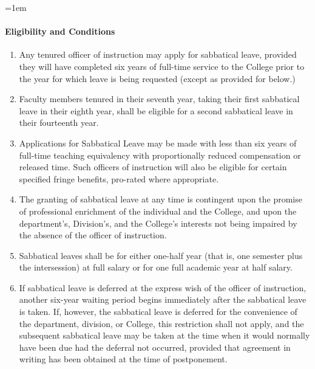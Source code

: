 \documentclass{manual}
\let\oldparagraph\paragraph
\renewcommand\paragraph{\leftskip=1em\oldparagraph}
\newcommand{\itemLevelA}{\alph*.}
\newcommand{\itemRefA}{\alph*}
\begin{document}
\paragraph{Eligibility and Conditions}
\begin{enumerate}[label=\itemLevelA,ref=\itemRefA]

\item Any tenured officer of instruction may apply for sabbatical leave, provided they will have completed six years of full-time service to the College prior to the year for which leave is being requested (except as provided for below.)

\item Faculty members tenured in their seventh year, taking their first sabbatical leave in their eighth year, shall be eligible for a second sabbatical leave in their fourteenth year.

\item Applications for Sabbatical Leave may be made with less than six years of full-time teaching equivalency with proportionally reduced compensation or released time. Such officers of instruction will also be eligible for certain specified fringe benefits, pro-rated where appropriate.

\item The granting of sabbatical leave at any time is contingent upon the promise of professional enrichment of the individual and the College, and upon the department's, Division's, and the College's interests not being impaired by the absence of the officer of instruction.

\item Sabbatical leaves shall be for either one-half year (that is, one semester plus the intersession) at full salary or for one full academic year at half salary.

\item If sabbatical leave is deferred at the express wish of the officer of instruction, another six-year waiting period begins immediately after the sabbatical leave is taken. If, however, the sabbatical leave is deferred for the convenience of the department, division, or College, this restriction shall not apply, and the subsequent sabbatical leave may be taken at the time when it would normally have been due had the deferral not occurred, provided that agreement in writing has been obtained at the time of postponement.
\end{enumerate}
\end{document}
